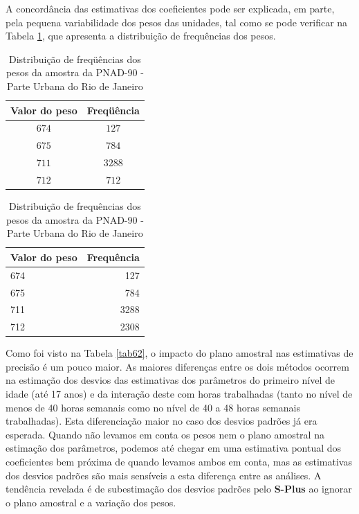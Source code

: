 \documentclass[]{book}
\numberwithin{example}{chapter}
\numberwithin{remark}{chapter}
\numberwithin{definition}{chapter}
\begin{document}
A concordância das estimativas dos coeficientes pode ser explicada, em
parte, pela pequena variabilidade dos pesos das unidades, tal como se
pode verificar na Tabela \ref{tab66}, que apresenta a distribuição de
frequências dos pesos.

\begin{center}
\begin{table}[tbp] \centering%
\caption{Distribuição de freqüências dos pesos da amostra da PNAD-90 - Parte
Urbana do Rio de Janeiro}\bigskip \label{tab66} 
\begin{tabular}{|c|c|}
\hline\hline
Valor do peso & Freq\"{u}ência \\ \hline\hline
$674$ & $127$ \\ 
$675$ & $784$ \\ 
$711$ & $3288$ \\ 
$712$ & $712$ \\ \hline\hline
\end{tabular}
\end{table}%
\end{center}

\begin{table}

\caption{\label{tab:pesofreq}Distribuição de frequências dos pesos da amostra da PNAD-90 - Parte
Urbana do Rio de Janeiro}
\centering
\begin{tabular}[t]{lr}
\toprule
Valor do peso & Frequência\\
\midrule
674 & 127\\
675 & 784\\
711 & 3288\\
712 & 2308\\
\bottomrule
\end{tabular}
\end{table}

Como foi visto na Tabela \ref{tab62}, o impacto do plano amostral nas
estimativas de precisão é um pouco maior. As maiores diferenças entre os
dois métodos ocorrem na estimação dos desvios das estimativas dos
parâmetros do primeiro nível de idade (até 17 anos) e da interação deste
com horas trabalhadas (tanto no nível de menos de 40 horas semanais como
no nível de 40 a 48 horas semanais trabalhadas). Esta diferenciação
maior no caso dos desvios padrões já era esperada. Quando não levamos em
conta os pesos nem o plano amostral na estimação dos parâmetros, podemos
até chegar em uma estimativa pontual dos coeficientes bem próxima de
quando levamos ambos em conta, mas as estimativas dos desvios padrões
são mais sensíveis a esta diferença entre as análises. A tendência
revelada é de subestimação dos desvios padrões pelo \textbf{S-Plus} ao
ignorar o plano amostral e a variação dos pesos.
\end{document}
